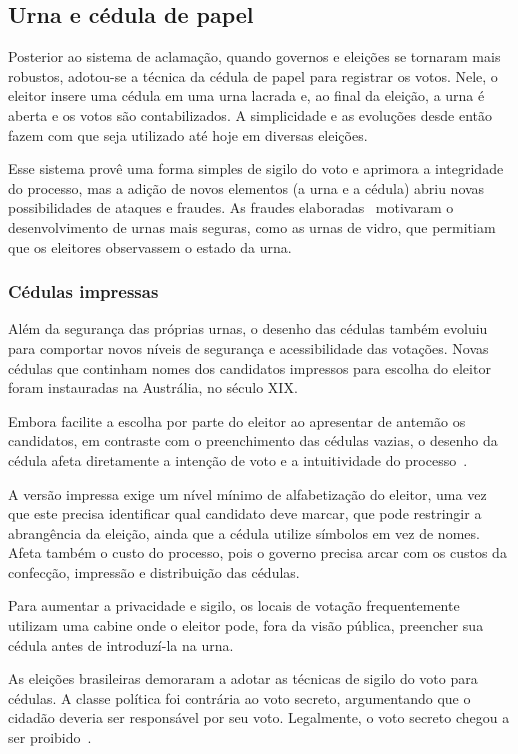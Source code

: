 \subsection{Urna e cédula de papel}

Posterior ao sistema de aclamação, quando governos e eleições se tornaram mais robustos, adotou-se a técnica da cédula de papel para registrar os votos. Nele, o eleitor insere uma cédula em uma urna lacrada e, ao final da eleição, a urna é aberta e os votos são contabilizados. A simplicidade e as evoluções desde então fazem com que seja utilizado até hoje em diversas eleições.

Esse sistema provê uma forma simples de sigilo do voto e aprimora a integridade do processo, mas a adição de novos elementos (a urna e a cédula) abriu novas possibilidades de ataques e fraudes. As fraudes elaboradas~\nocite{leslie1856} motivaram o desenvolvimento de urnas mais seguras, como as urnas de vidro, que permitiam que os eleitores observassem o estado da urna.

\subsubsection{Cédulas impressas}

Além da segurança das próprias urnas, o desenho das cédulas também evoluiu para comportar novos níveis de segurança e acessibilidade das votações. Novas cédulas que continham nomes dos candidatos impressos para escolha do eleitor foram instauradas na Austrália, no século XIX.

Embora facilite a escolha por parte do eleitor ao apresentar de antemão os candidatos, em contraste com o preenchimento das cédulas vazias, o desenho da cédula afeta diretamente a intenção de voto e a intuitividade do processo~\cite{everett2006measuring}.

A versão impressa exige um nível mínimo de alfabetização do eleitor, uma vez que este precisa identificar qual candidato deve marcar, que pode restringir a abrangência da eleição, ainda que a cédula utilize símbolos em vez de nomes. Afeta também o custo do processo, pois o governo precisa arcar com os custos da confecção, impressão e distribuição das cédulas.

Para aumentar a privacidade e sigilo, os locais de votação frequentemente utilizam uma cabine onde o eleitor pode, fora da visão pública, preencher sua cédula antes de introduzí-la na urna.

As eleições brasileiras demoraram a adotar as técnicas de sigilo do voto para cédulas. A classe política foi contrária ao voto secreto, argumentando que o cidadão deveria ser responsável por seu voto. Legalmente, o voto secreto chegou a ser proibido~\cite{nicolau2012eleicoes}.

